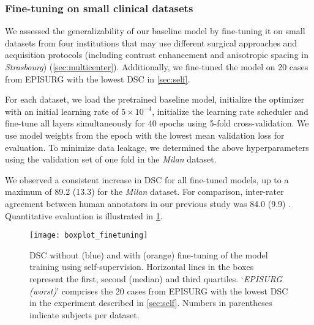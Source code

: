 \subsubsection{Fine-tuning on small clinical datasets}

We assessed the generalizability of our baseline model by fine-tuning it on small datasets from four institutions that may use different surgical approaches and acquisition protocols (including contrast enhancement and anisotropic spacing in \textit{Strasbourg}) (\cref{sec:multicenter}).
Additionally, we fine-tuned the model on 20 cases from EPISURG with the lowest \ac{DSC} in \cref{sec:self}.

For each dataset, we load the pretrained baseline model, initialize the optimizer with an initial learning rate of $5 \times 10^{-4}$, initialize the learning rate scheduler and fine-tune all layers simultaneously for 40 epochs using 5-fold cross-validation.
We use model weights from the epoch with the lowest mean validation loss for evaluation.
To minimize data leakage, we determined the above hyperparameters using the validation set of one fold in the \textit{Milan} dataset.

We observed a consistent increase in \ac{DSC} for all fine-tuned models, up to a maximum of 89.2 (13.3) for the \textit{Milan} dataset.
For comparison, inter-rater agreement between human annotators in our previous study was 84.0 (9.9) \cite{perez-garcia_simulation_2020}.
Quantitative evaluation is illustrated in \cref{fig:finetuning_quant}.


\begin{figure}
  \centering
  \texttt{[image: boxplot\_finetuning]}
  \caption{
    \ac{DSC} without (blue) and with (orange) fine-tuning of the model training using self-supervision.
    Horizontal lines in the boxes represent the first, second (median) and third quartiles.
    `\textit{EPISURG (worst)}' comprises the 20 cases from EPISURG with the lowest \ac{DSC} in the experiment described in \cref{sec:self}.
    Numbers in parentheses indicate subjects per dataset.
  }
  \label{fig:finetuning_quant}
\end{figure}

